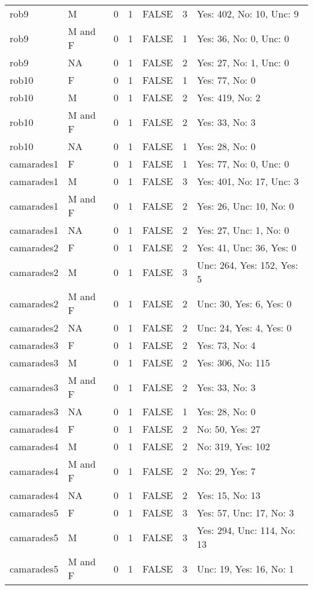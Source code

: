 \documentclass[
]{article}
\begin{document}
\begin{longtable}[]{@{}llrrlrl@{}}
rob9 & M & 0 & 1 & FALSE & 3 & Yes: 402, No: 10, Unc: 9 \\
rob9 & M and F & 0 & 1 & FALSE & 1 & Yes: 36, No: 0, Unc: 0 \\
rob9 & NA & 0 & 1 & FALSE & 2 & Yes: 27, No: 1, Unc: 0 \\
rob10 & F & 0 & 1 & FALSE & 1 & Yes: 77, No: 0 \\
rob10 & M & 0 & 1 & FALSE & 2 & Yes: 419, No: 2 \\
rob10 & M and F & 0 & 1 & FALSE & 2 & Yes: 33, No: 3 \\
rob10 & NA & 0 & 1 & FALSE & 1 & Yes: 28, No: 0 \\
camarades1 & F & 0 & 1 & FALSE & 1 & Yes: 77, No: 0, Unc: 0 \\
camarades1 & M & 0 & 1 & FALSE & 3 & Yes: 401, No: 17, Unc: 3 \\
camarades1 & M and F & 0 & 1 & FALSE & 2 & Yes: 26, Unc: 10, No: 0 \\
camarades1 & NA & 0 & 1 & FALSE & 2 & Yes: 27, Unc: 1, No: 0 \\
camarades2 & F & 0 & 1 & FALSE & 2 & Yes: 41, Unc: 36, Yes: 0 \\
camarades2 & M & 0 & 1 & FALSE & 3 & Unc: 264, Yes: 152, Yes: 5 \\
camarades2 & M and F & 0 & 1 & FALSE & 2 & Unc: 30, Yes: 6, Yes: 0 \\
camarades2 & NA & 0 & 1 & FALSE & 2 & Unc: 24, Yes: 4, Yes: 0 \\
camarades3 & F & 0 & 1 & FALSE & 2 & Yes: 73, No: 4 \\
camarades3 & M & 0 & 1 & FALSE & 2 & Yes: 306, No: 115 \\
camarades3 & M and F & 0 & 1 & FALSE & 2 & Yes: 33, No: 3 \\
camarades3 & NA & 0 & 1 & FALSE & 1 & Yes: 28, No: 0 \\
camarades4 & F & 0 & 1 & FALSE & 2 & No: 50, Yes: 27 \\
camarades4 & M & 0 & 1 & FALSE & 2 & No: 319, Yes: 102 \\
camarades4 & M and F & 0 & 1 & FALSE & 2 & No: 29, Yes: 7 \\
camarades4 & NA & 0 & 1 & FALSE & 2 & Yes: 15, No: 13 \\
camarades5 & F & 0 & 1 & FALSE & 3 & Yes: 57, Unc: 17, No: 3 \\
camarades5 & M & 0 & 1 & FALSE & 3 & Yes: 294, Unc: 114, No: 13 \\
camarades5 & M and F & 0 & 1 & FALSE & 3 & Unc: 19, Yes: 16, No: 1 \\

\end{longtable}
\end{document}

